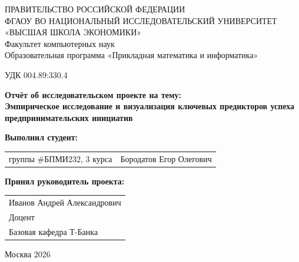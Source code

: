 \begin{titlepage}
\newpage

{
\begin{center}
ПРАВИТЕЛЬСТВО РОССИЙСКОЙ ФЕДЕРАЦИИ\\
ФГАОУ ВО НАЦИОНАЛЬНЫЙ ИССЛЕДОВАТЕЛЬСКИЙ УНИВЕРСИТЕТ\\
«ВЫСШАЯ ШКОЛА ЭКОНОМИКИ»
\\
\bigskip
Факультет компьютерных наук\\
Образовательная программа «Прикладная математика и информатика»
\end{center}
}

\vspace{2em}
УДК 004.89:330.4 %
\vspace{4em}

\begin{center}
{\bf Отчёт об исследовательском проекте на тему:}\\
{\bf Эмпирическое исследование и визуализация ключевых предикторов успеха предпринимательских инициатив}\\
\end{center}

\vspace{2em}

{\bf Выполнил студент: \vspace{2mm}}

{
\begin{tabular}{l@{\hskip 1.5cm}l}
группы \#БПМИ232, 3 курса & Бородатов Егор Олегович \\
\end{tabular}}


\vspace{1em}
{\bf Принял руководитель проекта: \vspace{2mm}}

{
\begin{tabular}{l}
Иванов Андрей Александрович\\
Доцент\\
Базовая кафедра Т-Банка
\end{tabular}}

\vspace{\fill}

\begin{center}
Москва 2026
\end{center}

\end{titlepage}
